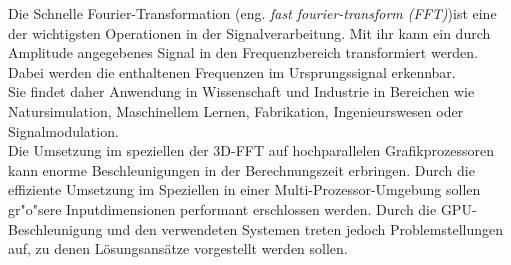 
Die Schnelle Fourier-Transformation (eng. \textit{fast fourier-transform (FFT)})ist eine der wichtigsten Operationen in der Signalverarbeitung. Mit ihr kann ein durch Amplitude angegebenes Signal in den Frequenzbereich transformiert werden. Dabei werden die enthaltenen Frequenzen im Ursprungssignal erkennbar.\\
Sie findet daher Anwendung in Wissenschaft und Industrie in Bereichen wie Natursimulation, Maschinellem Lernen, Fabrikation, Ingenieurswesen oder Signalmodulation.\\
Die Umsetzung im speziellen der 3D-FFT auf hochparallelen Grafikprozessoren kann enorme Beschleunigungen in der Berechnungszeit erbringen.
Durch die effiziente Umsetzung im Speziellen in einer Multi-Prozessor-Umgebung sollen gr"o"sere Inputdimensionen performant erschlossen werden. Durch die GPU-Beschleunigung und den verwendeten Systemen treten jedoch Problemstellungen auf, zu denen Lösungsansätze vorgestellt werden sollen.\\

